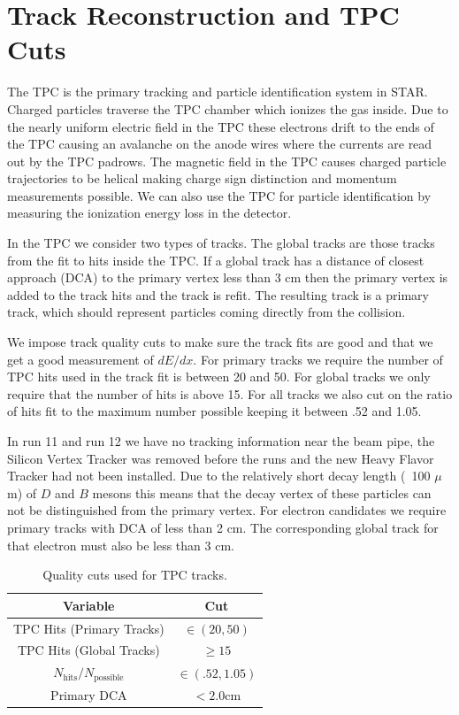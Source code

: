 \section{Track Reconstruction and TPC Cuts}

The TPC is the primary tracking and particle identification system in STAR. Charged particles traverse the TPC chamber which ionizes the gas inside. Due to the nearly uniform electric field in the TPC these electrons drift to the ends of the TPC causing an avalanche on the anode wires where the currents are read out by the TPC padrows. The magnetic field in the TPC causes charged particle trajectories to be helical making charge sign distinction and momentum measurements possible. We can also use the TPC for particle identification by measuring the ionization energy loss in the detector. 

In the TPC we consider two types of tracks. The global tracks are those tracks from the fit to hits inside the TPC. If a global track has a distance of closest approach (DCA) to the primary vertex less than 3 cm then the primary vertex is added to the track hits and the track is refit. The resulting track is a primary track, which should represent particles coming directly from the collision.

We impose track quality cuts to make sure the track fits are good and that we get a good measurement of $dE/dx$. For primary tracks we require the number of TPC hits used in the track fit is between 20 and 50. For global tracks we only require that the number of hits is above 15. For all tracks we also cut on the ratio of hits fit to the maximum number possible keeping it between .52 and 1.05.

In run 11 and run 12 we have no tracking information near the beam pipe, the Silicon Vertex Tracker was removed before the runs and the new Heavy Flavor Tracker had not been installed. Due to the relatively short decay length (~100 $\mu$m) of $D$ and $B$ mesons this means that the decay vertex of these particles can not be distinguished from the primary vertex. For electron candidates we require primary tracks with DCA of less than 2 cm. The corresponding global track for that electron must also be less than 3 cm. 

\begin{table}
\centering
\begin{tabular}{|c|c|}
\hline
Variable            & Cut \\
\hline
TPC Hits (Primary Tracks)          & $\in(20, 50)$ \\
\hline
TPC Hits (Global Tracks)          & $\geq 15$ \\
\hline
$N_{\text{hits}}/N_{\text{possible}}$               & $\in(.52, 1.05)$ \\
\hline
Primary DCA          & $< 2.0$cm \\
\hline
\end{tabular}
\caption[Track Quality Cuts]{Quality cuts used for TPC tracks.}
\label{tab:TPCQual}
\end{table}

